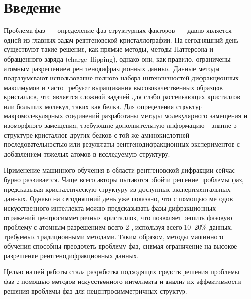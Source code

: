 \section*{Введение}

Проблема фаз~--– определение фаз структурных факторов~--- давно является одной из главных задач рентгеновской кристаллографии. На сегодняшний день существуют такие решения, как прямые методы, методы Паттерсона и обращенного заряда (charge--flipping), однако они, как правило, ограничены атомным разрешением рентгенодифракционных данных. Данные методы подразумевают использование полного набора интенсивностей дифракционных максимумов и часто требуют выращивания высококачественных образцов кристаллов, что является сложной задачей для слабо рассеивающих кристаллов или больших молекул, таких как белки. Для определения структур макромолекулярных соединений разработаны методы молекулярного замещения и изоморфного замещения, требующие дополнительную информацию - знание о структуре кристаллов других белков с той же аминокислотной последовательностью или результаты рентгенодифракционных экспериментов с добавлением тяжелых атомов в исследуемую структуру. 

Применение машинного обучения в области рентгеновской дифракции сейчас бурно развивается. Чаще всего авторы пытаются обойти решение проблемы фаз, предсказывая кристаллическую структуру из доступных экспериментальных данных. Однако на сегодняшний день уже показано, что с помощью методов искусственного интеллекта можно предсказывать фазы дифракционных отражений центросимметричных кристаллов, что позволяет решить фазовую проблему с атомным разрешением всего 2 \text{\AA}, используя всего 10--20\% данных, требуемых традиционными методами. Таким образом, методы машинного обучения способны преодолеть проблему фаз, снимая ограничение на высокое разрешение рентгенодифракционных данных.

Целью нашей работы стала разработка подходящих средств решения проблемы фаз с помощью методов искусственного интеллекта и анализ их эффективности решения проблемы фаз для нецентросимметричных структур.





